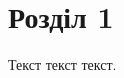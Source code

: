 \documentclass[a4paper,12pt]{eskdtext}
\begin{document}
\maketitle
\tableofcontents
\newpage
\section{Розділ 1}
Текст текст текст.
\end{document}
